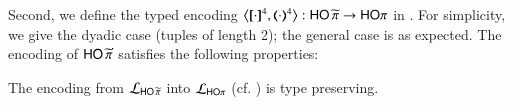 \documentclass[runningheads]{llncs}
\begin{document}
{%
%

Second, we define the typed encoding
	$\enco{\map{\cdot}^{4}, \mapt{\cdot}^{4}}: \PHOp \to \HOp$ 
in .
For simplicity, we give the dyadic case (tuples of length 2);
the general case is as expected.
The encoding of $\mathsf{HO}\,{\widetilde{\pi}}$  satisfies the following properties:


{
\begin{proposition}
The encoding from
		$\mathcal{L}_{\mathsf{HO}\,{\widetilde{\pi}}}$ into $\mathcal{L}_{\mathsf{HO}\pi}$ (cf. )
is type preserving.
\end{proposition}}

}
\end{document}
